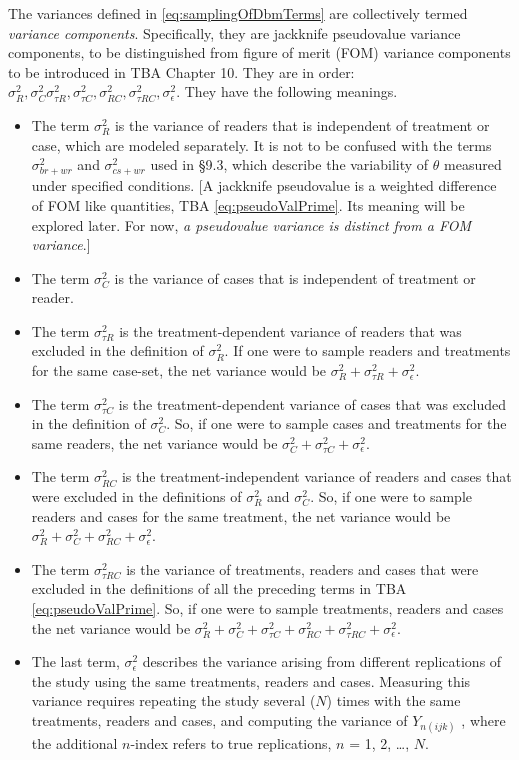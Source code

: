 \documentclass[
]{book}
\providecommand{\tightlist}{%
  \setlength{\itemsep}{0pt}\setlength{\parskip}{0pt}}
\begin{document}
The variances defined in \eqref{eq:samplingOfDbmTerms} are collectively termed \emph{variance components}. Specifically, they are jackknife pseudovalue variance components, to be distinguished from figure of merit (FOM) variance components to be introduced in TBA Chapter 10. They are in order: \(\sigma_{R}^{2} ,\sigma_{C}^{2} \sigma_{\tau R}^{2},\sigma_{\tau C}^{2},\sigma_{RC}^{2}, \sigma_{\tau RC}^{2},\sigma_{\epsilon}^{2}\). They have the following meanings.

\begin{itemize}
\tightlist
\item
  The term \(\sigma_{R}^{2}\) is the variance of readers that is independent of treatment or case, which are modeled separately. It is not to be confused with the terms \(\sigma_{br+wr}^{2}\) and \(\sigma_{cs+wr}^{2}\) used in §9.3, which describe the variability of \(\theta\) measured under specified conditions. {[}A jackknife pseudovalue is a weighted difference of FOM like quantities, TBA \eqref{eq:pseudoValPrime}. Its meaning will be explored later. For now, \emph{a pseudovalue variance is distinct from a FOM variance}.{]}
\item
  The term \(\sigma_{C}^{2}\) is the variance of cases that is independent of treatment or reader.
\item
  The term \(\sigma_{\tau R}^{2}\) is the treatment-dependent variance of readers that was excluded in the definition of \(\sigma_{R}^{2}\). If one were to sample readers and treatments for the same case-set, the net variance would be \(\sigma_{R}^{2}+\sigma_{\tau R}^{2}+\sigma_{\epsilon}^{2}\).
\item
  The term \(\sigma_{\tau C}^{2}\) is the treatment-dependent variance of cases that was excluded in the definition of \(\sigma_{C}^{2}\). So, if one were to sample cases and treatments for the same readers, the net variance would be \(\sigma_{C}^{2}+\sigma_{\tau C}^{2}+\sigma_{\epsilon}^{2}\).
\item
  The term \(\sigma_{RC}^{2}\) is the treatment-independent variance of readers and cases that were excluded in the definitions of \(\sigma_{R}^{2}\) and \(\sigma_{C}^{2}\). So, if one were to sample readers and cases for the same treatment, the net variance would be \(\sigma_{R}^{2}+\sigma_{C}^{2}+\sigma_{RC}^{2}+\sigma_{\epsilon}^{2}\).
\item
  The term \(\sigma_{\tau RC}^{2}\) is the variance of treatments, readers and cases that were excluded in the definitions of all the preceding terms in TBA \eqref{eq:pseudoValPrime}. So, if one were to sample treatments, readers and cases the net variance would be \(\sigma_{R}^{2}+\sigma_{C}^{2}+\sigma_{\tau C}^{2}+\sigma_{RC}^{2}+\sigma_{\tau RC}^{2}+\sigma_{\epsilon}^{2}\).
\item
  The last term, \(\sigma_{\epsilon}^{2}\) describes the variance arising from different replications of the study using the same treatments, readers and cases. Measuring this variance requires repeating the study several (\(N\)) times with the same treatments, readers and cases, and computing the variance of \(Y_{n(ijk)}\) , where the additional \(n\)-index refers to true replications, \(n\) = 1, 2, \ldots, \(N\).
\end{itemize}
\end{document}
